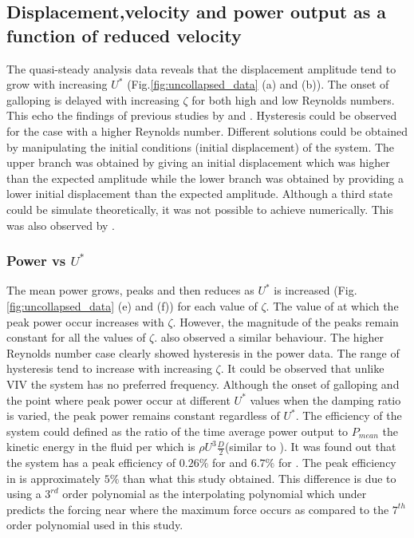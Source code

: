 \subsection{Displacement,velocity and power output as a function of reduced velocity}


 The quasi-steady analysis data reveals that the displacement amplitude tend to grow with increasing $U^*$ (Fig.\ref{fig:uncollapsed_data} (a) and (b)). The onset of galloping is delayed with increasing $\zeta$ for both high and low Reynolds numbers. This echo the findings of previous studies by \cite{Parkinson1964} and \cite{Barrero-Gil2010a}. Hysteresis could be observed for the case with a higher Reynolds number. Different solutions could be obtained by manipulating the initial conditions (initial displacement) of the system. The upper branch was obtained by giving an initial displacement which was higher than the expected amplitude while the lower branch was obtained by providing a lower initial displacement than the expected amplitude. Although a third state could be simulate theoretically, it was not possible to achieve numerically. This was also observed by \cite{Vio2007}.   

 
 \subsubsection*{Power vs $U^*$}
 
 The mean power grows, peaks and then reduces as $U^*$ is increased (Fig.\ref{fig:uncollapsed_data} (e) and (f)) for each value of $\zeta$. The value of  \ustar at which the peak power occur increases with $\zeta$. However, the magnitude of the peaks remain constant for all the values of $\zeta$.  \cite{Barrero-Gil2010a} also observed a similar behaviour. The higher Reynolds number case clearly showed hysteresis in the power data. The range of hysteresis tend to increase with increasing $\zeta$. It could be observed that unlike VIV the  system has no preferred frequency. Although the onset of galloping and the point where peak power occur at different $U^*$ values when the damping ratio is varied, the peak power remains constant regardless of $U^*$. The efficiency of the system could defined as the ratio of the time average power output to $P_{mean}$ the kinetic energy in the fluid per which is $\rho U^3\frac{D}{2}$(similar to \cite{Barrero-Gil2010a}). It was found out that the  system has a peak efficiency of  $0.26\%$  for  and $6.7\%$ for . The peak efficiency in \cite{Barrero-Gil2010a} is approximately $5\%$ than what this study obtained. This difference is due to \cite{Barrero-Gil2010a} using a $3^{rd}$ order polynomial as the interpolating polynomial which under predicts the forcing near where the maximum force occurs as compared to the $7^{th}$ order polynomial used in this study.   
 
